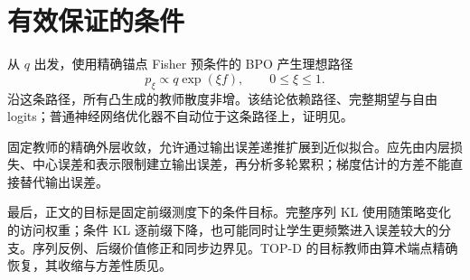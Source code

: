 \section{有效保证的条件}
从 $q$ 出发，使用精确锚点 Fisher 预条件的 BPO 产生理想路径
\begin{equation}
p_\xi\propto q\exp(\xi f),\qquad 0\le\xi\le1.
\end{equation}
沿这条路径，所有凸生成的教师散度非增。该结论依赖路径、完整期望与自由 logits；普通神经网络优化器不自动位于这条路径上，证明见。

固定教师的精确外层收敛，允许通过输出误差递推扩展到近似拟合。应先由内层损失、中心误差和表示限制建立输出误差，再分析多轮累积；梯度估计的方差不能直接替代输出误差。

最后，正文的目标是固定前缀测度下的条件目标。完整序列 KL 使用随策略变化的访问权重；条件 KL 逐前缀下降，也可能同时让学生更频繁进入误差较大的分支。序列反例、后缀价值修正和同步边界见。TOP-D 的目标教师由算术端点精确恢复，其收缩与方差性质见。
